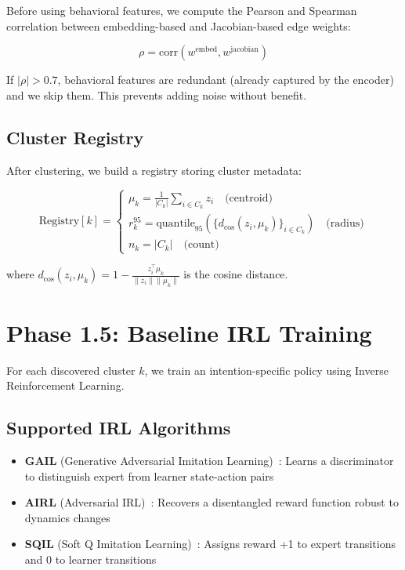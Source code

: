 \documentclass{article}
\begin{document}
Before using behavioral features, we compute the Pearson and Spearman correlation between embedding-based and Jacobian-based edge weights:

\begin{equation}
    \rho = \text{corr}(w^{\text{embed}}, w^{\text{jacobian}})
\end{equation}

If $|\rho| > 0.7$, behavioral features are redundant (already captured by the encoder) and we skip them. This prevents adding noise without benefit.

\subsection{Cluster Registry}

After clustering, we build a registry storing cluster metadata:

\begin{equation}
    \text{Registry}[k] = \left\{
    \begin{array}{l}
        \mu_k = \frac{1}{|C_k|} \sum_{i \in C_k} z_i \quad \text{(centroid)} \\
        r_k^{95} = \text{quantile}_{95}\left(\{d_{\cos}(z_i, \mu_k)\}_{i \in C_k}\right) \quad \text{(radius)} \\
        n_k = |C_k| \quad \text{(count)}
    \end{array}
    \right.
\end{equation}

where $d_{\cos}(z_i, \mu_k) = 1 - \frac{z_i^\top \mu_k}{\|z_i\| \|\mu_k\|}$ is the cosine distance.

\section{Phase 1.5: Baseline IRL Training}

For each discovered cluster $k$, we train an intention-specific policy using Inverse Reinforcement Learning.

\subsection{Supported IRL Algorithms}

\begin{itemize}
    \item \textbf{GAIL} (Generative Adversarial Imitation Learning)~\cite{ho2016generative}: Learns a discriminator to distinguish expert from learner state-action pairs
    \item \textbf{AIRL} (Adversarial IRL)~\cite{fu2018learning}: Recovers a disentangled reward function robust to dynamics changes
    \item \textbf{SQIL} (Soft Q Imitation Learning)~\cite{reddy2020sqil}: Assigns reward +1 to expert transitions and 0 to learner transitions
\end{itemize}
\end{document}
